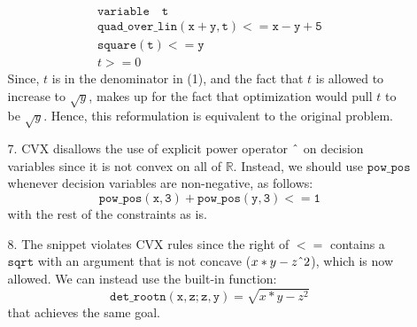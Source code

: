 \documentclass{article}
\newcommand{\caret}{\text{\^{}}}
\begin{document}
\begin{itemize}
\begin{itemize}
    \begin{align*}
      \mathtt{variable \quad t} \\
      \mathtt{quad\_over\_lin(x + y, t) <= x - y + 5} \tag{1} \\
      \mathtt{square(t) <= y} \\
      t >= 0
    \end{align*}
    Since, $t$ is in the denominator in (1), and the fact that $t$ is allowed to increase to $\sqrt{y}$, makes up for the fact that optimization would pull $t$ to be $\sqrt{y}$. Hence, this reformulation is equivalent to the original problem. 
    \item[7.] CVX disallows the use of explicit power operator $\caret$ on decision variables since it is not convex on all of $\mathbb{R}$. Instead, we should use $\mathtt{pow\_pos}$ whenever decision variables are non-negative, as follows:
    \[ \mathtt{pow\_pos(x, 3) + pow\_pos(y, 3) <= 1} \]
    with the rest of the constraints as is.
    \item[8.] The snippet violates CVX rules since the right of $\mathtt{<=}$ contains a $\mathtt{sqrt}$ with an argument that is not concave ($x*y - z\caret2$), which is now allowed. We can instead use the built-in function:
    \[ \mathtt{det\_rootn(x, z; z, y)} = \sqrt{x*y - z^2} \]
    that achieves the same goal.
  \end{itemize}


\end{itemize}
\end{document}
